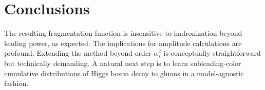 \section{Conclusions}\label{sec:conclusions}

The resulting fragmentation function is insensitive to hadronization
beyond leading power, as expected. The implications for amplitude
calculations are profound. Extending the method beyond order
$\alpha_s^2$ is conceptually straightforward but technically demanding.
A natural next step is to learn subleading-color cumulative
distributions of Higgs boson decay to gluons in a model-agnostic
fashion.

